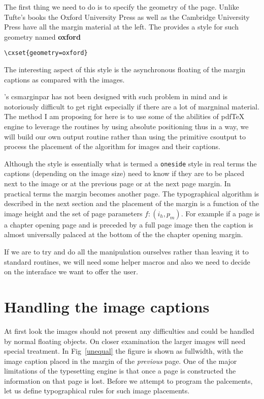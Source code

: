 The first thing we need to do is to specify the geometry of the page. Unlike Tufte’s books the Oxford University Press as well as the Cambridge University Press have all the margin material at the left. The  provides a style for such geometry named \textbf{oxford}

\begin{scriptexample}{}{}
\begin{verbatim}
\cxset{geometry=oxford}
\end{verbatim}
\end{scriptexample}

The interesting aspect of this style is the asynchronous floating of the margin captions as compared with
the images. 

\latexe’s   cs{marginpar} has not been designed with such problem in mind and is notoriously difficult
to get right especially if there are a lot of margninal material. The method I am proposing for here
is to use some of the abilities of pdfTeX engine to leverage the routines by using absolute positioning
thus in a way, we will build our own output routine rather than using the primitive cs{output} to process
the placement of the algorithm for images and their captions. 

Although the style is essentially what is termed a \texttt{oneside} style in real terms the captions (depending on the image size)  need to know if they are to be placed next to the image or at the previous page or at the next page margin. In practical terms the margin becomes another page. The typographical algorithm is described in the next section and the placement of the margin is a function of the image height and the set of page parameters $f: (i_h, p_m)$. 
For example if a page is a chapter opening page and is preceded  by a full page image then the caption is almost universally palaced at the bottom of the the chapter opening margin.

If we are to try and do all the manipulation ourselves rather than leaving it to standard \latexe routines, we will
need some helper macros and also we need to decide on the interaface we want to offer the user. 

\doubletakeimage

\section{Handling the image captions}

At first look the images should not present any difficulties and could be handled by normal
floating \latexe objects. On closer examination the larger images will need special treatment. In Fig~\ref{unequal}
the figure is shown as fullwidth, with the image caption placed in the margin of the \emph{previous} page. One of the major limitations of the \tex typesetting engine is that once a page is constructed the information on that page is lost. Before we attempt to program the palcements, let us define typographical rules for such image placements.

